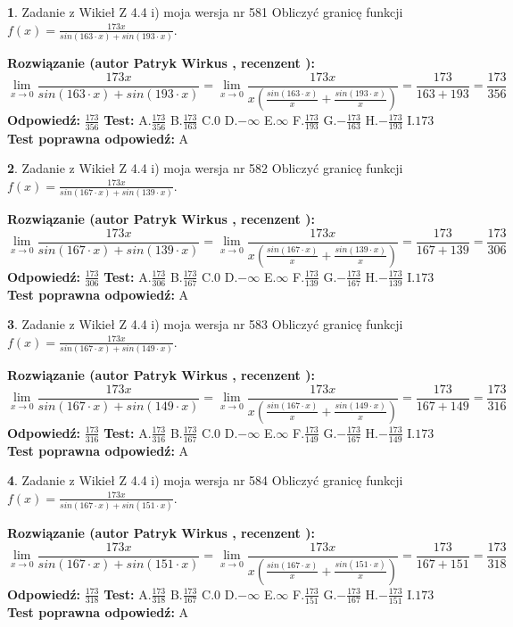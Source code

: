 \documentclass[12pt, a4paper]{article}
\theoremstyle{definition} %
\newtheorem{zad}{}
\newcommand{\zadStart}[1]{\begin{zad}#1\newline}
\newcommand{\zadStop}{\end{zad}}
\newcommand{\rozwStart}[2]{\noindent \textbf{Rozwiązanie (autor #1 , recenzent #2): }\newline}
\newcommand{\rozwStop}{\newline}
\newcommand{\odpStart}{\noindent \textbf{Odpowiedź:}\newline}
\newcommand{\odpStop}{\newline}
\newcommand{\testStart}{\noindent \textbf{Test:}\newline}
\newcommand{\testStop}{\newline}
\newcommand{\kluczStart}{\noindent \textbf{Test poprawna odpowiedź:}\newline}
\newcommand{\kluczStop}{\newline}
\begin{document}
\zadStart{Zadanie z Wikieł Z 4.4 i) moja wersja nr 581}
Obliczyć granicę funkcji $f(x)=\frac{173x}{sin(163\cdot x) +sin(193\cdot x)}$.
\zadStop
\rozwStart{Patryk Wirkus}{}
$$\lim\limits_{x\to 0}\frac{173x}{sin(163\cdot x) +sin(193\cdot x)}=\lim\limits_{x\to 0}\frac{173x}{x(\frac{sin(163\cdot x)}{x}+\frac{sin(193\cdot x)}{x})}=\frac{173}{163+193} = \frac{173}{356}$$
\rozwStop
\odpStart
$\frac{173}{356}$
\odpStop
\testStart
A.$\frac{173}{356}$
B.$\frac{173}{163}$
C.$0$
D.$-\infty$
E.$\infty$
F.$\frac{173}{193}$
G.$-\frac{173}{163}$
H.$-\frac{173}{193}$
I.$173$
\testStop
\kluczStart
A
\kluczStop



\zadStart{Zadanie z Wikieł Z 4.4 i) moja wersja nr 582}
Obliczyć granicę funkcji $f(x)=\frac{173x}{sin(167\cdot x) +sin(139\cdot x)}$.
\zadStop
\rozwStart{Patryk Wirkus}{}
$$\lim\limits_{x\to 0}\frac{173x}{sin(167\cdot x) +sin(139\cdot x)}=\lim\limits_{x\to 0}\frac{173x}{x(\frac{sin(167\cdot x)}{x}+\frac{sin(139\cdot x)}{x})}=\frac{173}{167+139} = \frac{173}{306}$$
\rozwStop
\odpStart
$\frac{173}{306}$
\odpStop
\testStart
A.$\frac{173}{306}$
B.$\frac{173}{167}$
C.$0$
D.$-\infty$
E.$\infty$
F.$\frac{173}{139}$
G.$-\frac{173}{167}$
H.$-\frac{173}{139}$
I.$173$
\testStop
\kluczStart
A
\kluczStop



\zadStart{Zadanie z Wikieł Z 4.4 i) moja wersja nr 583}
Obliczyć granicę funkcji $f(x)=\frac{173x}{sin(167\cdot x) +sin(149\cdot x)}$.
\zadStop
\rozwStart{Patryk Wirkus}{}
$$\lim\limits_{x\to 0}\frac{173x}{sin(167\cdot x) +sin(149\cdot x)}=\lim\limits_{x\to 0}\frac{173x}{x(\frac{sin(167\cdot x)}{x}+\frac{sin(149\cdot x)}{x})}=\frac{173}{167+149} = \frac{173}{316}$$
\rozwStop
\odpStart
$\frac{173}{316}$
\odpStop
\testStart
A.$\frac{173}{316}$
B.$\frac{173}{167}$
C.$0$
D.$-\infty$
E.$\infty$
F.$\frac{173}{149}$
G.$-\frac{173}{167}$
H.$-\frac{173}{149}$
I.$173$
\testStop
\kluczStart
A
\kluczStop



\zadStart{Zadanie z Wikieł Z 4.4 i) moja wersja nr 584}
Obliczyć granicę funkcji $f(x)=\frac{173x}{sin(167\cdot x) +sin(151\cdot x)}$.
\zadStop
\rozwStart{Patryk Wirkus}{}
$$\lim\limits_{x\to 0}\frac{173x}{sin(167\cdot x) +sin(151\cdot x)}=\lim\limits_{x\to 0}\frac{173x}{x(\frac{sin(167\cdot x)}{x}+\frac{sin(151\cdot x)}{x})}=\frac{173}{167+151} = \frac{173}{318}$$
\rozwStop
\odpStart
$\frac{173}{318}$
\odpStop
\testStart
A.$\frac{173}{318}$
B.$\frac{173}{167}$
C.$0$
D.$-\infty$
E.$\infty$
F.$\frac{173}{151}$
G.$-\frac{173}{167}$
H.$-\frac{173}{151}$
I.$173$
\testStop
\kluczStart
A
\kluczStop
\end{document}
